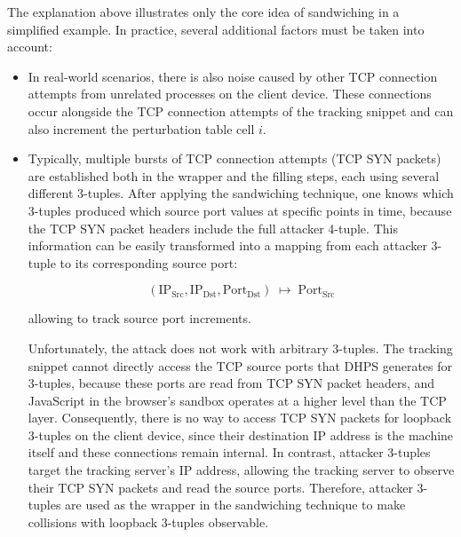 \documentclass[twocolumn]{report}
\begin{document}
The explanation above illustrates only the \alert{core idea of sandwiching} in a simplified example. In practice, several additional factors must be taken into account:

\begin{itemize}
	\item {} In real-world scenarios, there is also \alert{noise} caused by other TCP connection attempts from unrelated processes on the client device. These connections occur alongside the TCP connection attempts of the tracking snippet and can also increment the perturbation table cell \( i \).
	\item {} Typically, multiple \alert{bursts of TCP connection attempts} (TCP SYN packets) are established both in the wrapper and the filling steps, each using several different 3-tuples. After applying the sandwiching technique, one knows which 3-tuples produced which source port values at specific points in time, because the \alert{TCP SYN packet headers} include the full attacker 4-tuple. This information can be easily transformed into a mapping from each attacker 3-tuple to its corresponding source port:

	\vspace{0.2cm}
	\begin{minipage}{\columnwidth}
		\[
			(\mathrm{IP_{Src}}, \mathrm{IP_{Dst}}, \mathrm{Port_{Dst}}) \;\mapsto\; \mathrm{Port_{Src}}
		\]
	\end{minipage}
	\vspace{0cm}
  allowing to track source port increments.

	 Unfortunately, the attack does not work with arbitrary 3-tuples. The tracking snippet cannot directly access the TCP source ports that DHPS generates for 3-tuples, because these ports are read from TCP SYN packet headers, and JavaScript in the \alert{browser’s sandbox} operates at a higher level than the TCP layer. Consequently, there is no way to access TCP SYN packets for \alert{loopback 3-tuples} on the client device, since their destination IP address is the machine itself and these connections remain internal. In contrast, \alert{attacker 3-tuples} target the tracking server’s IP address, allowing the \alert{tracking server} to observe their TCP SYN packets and read the source ports. Therefore, attacker 3-tuples are used as the wrapper in the sandwiching technique to make collisions with loopback 3-tuples observable.
\end{itemize}
\end{document}
